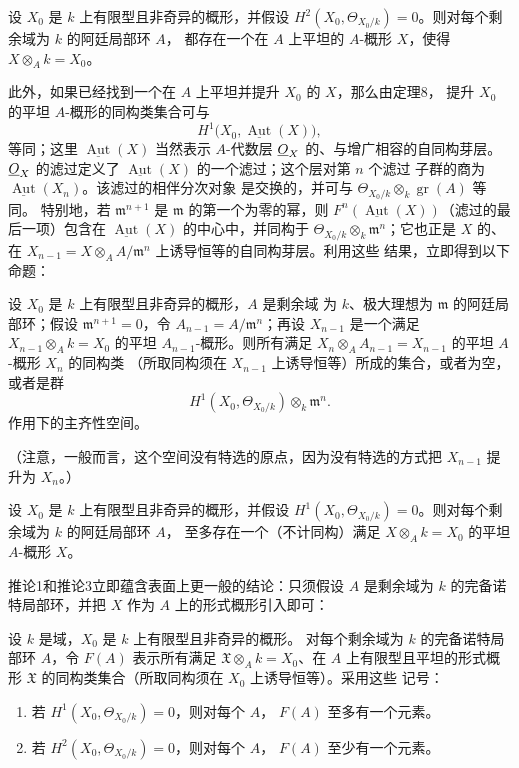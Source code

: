  设 $X_0$ 是 $k$ 上有限型且非奇异的概形，并假设
$H^2(X_0,\Theta_{X_0/k})=0$。则对每个剩余域为 $k$ 的阿廷局部环 $A$，
都存在一个在 $A$ 上平坦的 $A$-概形 $X$，使得
$X\otimes_A k=X_0$。

此外，如果已经找到一个在 $A$ 上平坦并提升 $X_0$ 的 $X$，那么由定理8，
提升 $X_0$ 的平坦 $A$-概形的同构类集合可与
\[
  H^1\bigl(X_0,\underline{\operatorname{Aut}}(X)\bigr),
\]
等同；这里 $\underline{\operatorname{Aut}}(X)$ 当然表示 $A$-代数层
$\underline{O}_X$ 的、与增广相容的自同构芽层。$\underline{O}_X$ 的滤过定义了
$\underline{\operatorname{Aut}}(X)$ 的一个滤过；这个层对第 $n$ 个滤过
子群的商为 $\underline{\operatorname{Aut}}(X_n)$。该滤过的相伴分次对象
是交换的，并可与 $\Theta_{X_0/k}\otimes_k\operatorname{gr}(A)$ 等同。
特别地，若 $\mathfrak m^{n+1}$ 是 $\mathfrak m$ 的第一个为零的幂，则
$F^n(\underline{\operatorname{Aut}}(X))$（滤过的最后一项）包含在
$\underline{\operatorname{Aut}}(X)$ 的中心中，并同构于
$\Theta_{X_0/k}\otimes_k\mathfrak m^n$；它也正是 $X$ 的、在
$X_{n-1}=X\otimes_A A/\mathfrak m^n$ 上诱导恒等的自同构芽层。利用这些
结果，立即得到以下命题：

 设 $X_0$ 是 $k$ 上有限型且非奇异的概形，$A$ 是剩余域
为 $k$、极大理想为 $\mathfrak m$ 的阿廷局部环；假设
$\mathfrak m^{n+1}=0$，令 $A_{n-1}=A/\mathfrak m^n$；再设 $X_{n-1}$
是一个满足 $X_{n-1}\otimes_A k=X_0$ 的平坦 $A_{n-1}$-概形。则所有满足
$X_n\otimes_A A_{n-1}=X_{n-1}$ 的平坦 $A$-概形 $X_n$ 的同构类
（所取同构须在 $X_{n-1}$ 上诱导恒等）所成的集合，或者为空，或者是群
\[
  H^1(X_0,\Theta_{X_0/k})\otimes_k\mathfrak m^n.
\]
作用下的主齐性空间。

（注意，一般而言，这个空间没有特选的原点，因为没有特选的方式把
$X_{n-1}$ 提升为 $X_n$。）

 设 $X_0$ 是 $k$ 上有限型且非奇异的概形，并假设
$H^1(X_0,\Theta_{X_0/k})=0$。则对每个剩余域为 $k$ 的阿廷局部环 $A$，
至多存在一个（不计同构）满足 $X\otimes_A k=X_0$ 的平坦 $A$-概形 $X$。

推论1和推论3立即蕴含表面上更一般的结论：只须假设 $A$ 是剩余域为 $k$
的完备诺特局部环，并把 $X$ 作为 $A$ 上的形式概形引入即可：

 设 $k$ 是域，$X_0$ 是 $k$ 上有限型且非奇异的概形。
对每个剩余域为 $k$ 的完备诺特局部环 $A$，令 $F(A)$ 表示所有满足
$\mathfrak X\otimes_A k=X_0$、在 $A$ 上有限型且平坦的形式概形
$\mathfrak X$ 的同构类集合（所取同构须在 $X_0$ 上诱导恒等）。采用这些
记号：
\begin{enumerate}
  \item[\textit{i.}] 若 $H^1(X_0,\Theta_{X_0/k})=0$，则对每个 $A$，
    $F(A)$ 至多有一个元素。
  \item[\textit{ii.}] 若 $H^2(X_0,\Theta_{X_0/k})=0$，则对每个 $A$，
    $F(A)$ 至少有一个元素。
\end{enumerate}

